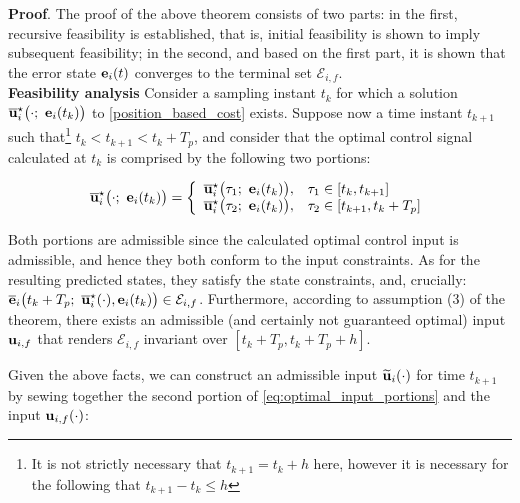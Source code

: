 \textbf{Proof}. The proof of the above theorem consists of two parts:
in the first, recursive feasibility is established, that is, initial
feasibility is shown to imply subsequent feasibility; in the second, and based
on the first part, it is shown that the error state $\bm{\mathbf{e}}_i(t)$ converges
to the terminal set $\mathcal{E}_{i,f}$.\\

\textbf{Feasibility analysis}
Consider a sampling instant $t_k$ for which a
solution $\overline{\vect{u}}_i^{\star}\big(\cdot;\ \vect{e}_i(t_k)\big)$ to
\eqref{position_based_cost} exists.
Suppose now a time instant $t_{k+1}$ such that\footnote{It is not strictly necessary
that $t_{k+1} = t_k + h$ here, however it is necessary for the following that
$t_{k+1} - t_k \leq h$} $t_k < t_{k+1} < t_k + T_p$, and consider that the
optimal control signal calculated at $t_k$ is comprised by the following two
portions:

\begin{equation}
  \overline{\vect{u}}_i^{\star}\big(\cdot;\ \vect{e}_i(t_k)\big) = \left\{
      \begin{array}{ll}
        \overline{\vect{u}}_i^{\star}\big(\tau_1;\ \vect{e}_i(t_k)\big), & \tau_1 \in [t_k, t_{k+1}] \\
        \overline{\vect{u}}_i^{\star}\big(\tau_2;\ \vect{e}_i(t_k)\big), & \tau_2 \in [t_{k+1}, t_k + T_p]
      \end{array}
      \right.
  \label{eq:optimal_input_portions}
\end{equation}

Both portions are admissible since the calculated optimal control input is
admissible, and hence they both conform to the input constraints.
As for the resulting predicted states, they satisfy the state constraints, and,
crucially: $\overline{\vect{e}}_i\big(t_k + T_p;\ \overline{\vect{u}}_i^{\star}(\cdot), \vect{e}_i(t_k)\big) \in \mathcal{E}_{i,f}$.
Furthermore, according to assumption (3) of the theorem, there exists an
admissible (and certainly not guaranteed optimal) input $\bm{\mathbf{u}}_{i,f}$ that
renders $\mathcal{E}_{i,f}$ invariant over $[t_k + T_p, t_k + T_p + h]$.

Given the above facts, we can construct an admissible input
$\widetilde{\bm{\mathbf{u}}}_i(\cdot)$  for time $t_{k+1}$ by sewing together the second
portion of \eqref{eq:optimal_input_portions} and the input
$\bm{\mathbf{u}}_{i,f}(\cdot)$:

